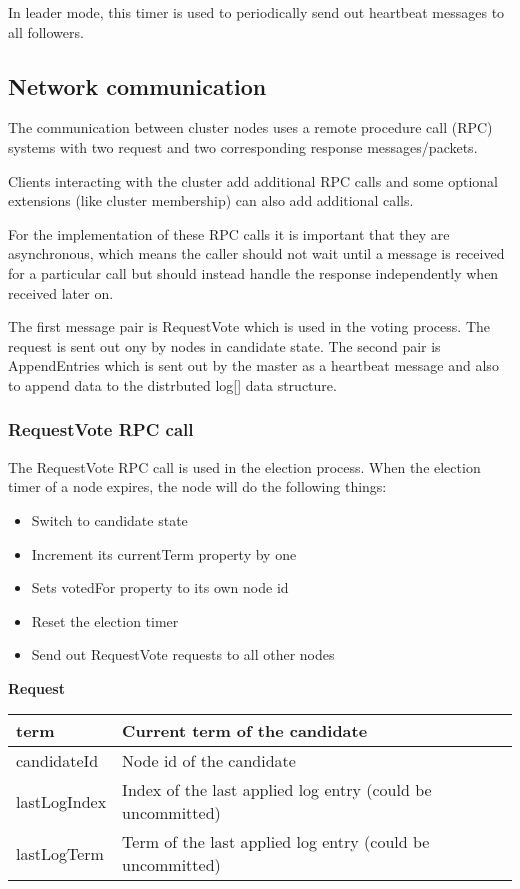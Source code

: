 In leader mode, this timer is used to periodically send out heartbeat messages to all followers.

\subsection{Network communication}

The communication between cluster nodes uses a remote procedure call (RPC) systems with two request and two corresponding response messages/packets.

Clients interacting with the cluster add additional RPC calls and some optional extensions (like cluster membership) can also
add additional calls.

For the implementation of these RPC calls it is important that they are asynchronous, which means the caller should not wait until a message is received
for a particular call but should instead handle the response independently when received later on.

The first message pair is RequestVote which is used in the voting process. The request is sent out ony by nodes in candidate state.
The second pair is AppendEntries which is sent out by the master as a heartbeat message and also to append data to the distrbuted log[] data structure.

\subsubsection*{RequestVote RPC call}
The RequestVote RPC call is used in the election process. When the election timer of a node expires, the node will do the following things:

\begin{itemize}
    \item Switch to candidate state
    \item Increment its currentTerm property by one
    \item Sets votedFor property to its own node id
    \item Reset the election timer
    \item Send out RequestVote requests to all other nodes
\end{itemize}

\textbf{Request}

\begin{tabular}{ | l | p{13.7cm} | }
\hline
term & Current term of the candidate \\ \hline
candidateId & Node id of the candidate \\ \hline
lastLogIndex & Index of the last applied log entry (could be uncommitted) \\ \hline
lastLogTerm & Term of the last applied log entry (could be uncommitted) \\ \hline
\end{tabular}


